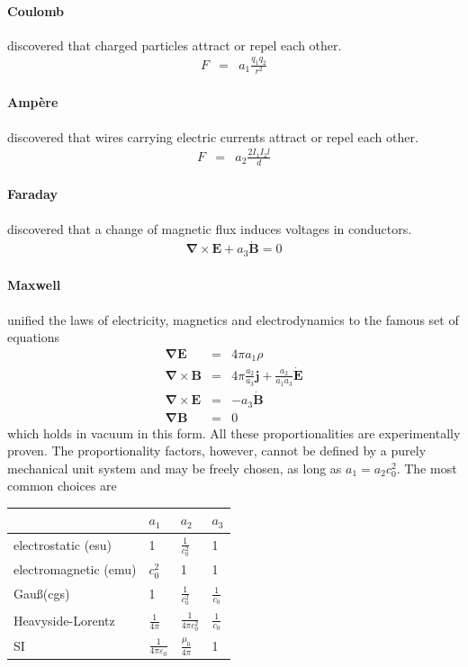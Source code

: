 \documentclass[12pt,a4paper,twoside,openright,BCOR10mm,headsepline,titlepage,abstracton,chapterprefix,final]{scrreprt}
\newcommand\Vector[1]{{\mathbf{#1}}}
\newcommand\vacuum{0}
\newcommand\Nabla{\Vector{\nabla}}
\newcommand\scalarEfield{E}
\newcommand\scalarBfield{B}
\newcommand\Efield{\Vector{\scalarEfield}}
\newcommand\Bfield{\Vector{\scalarBfield}}
\newcommand\vacuumpermeability{\scalarpermeability_{\vacuum}}
\newcommand\scalarpermeability{\mu}
\newcommand\vacuumpermittivity{\scalarpermittivity_{\vacuum}}
\newcommand\scalarpermittivity{\varepsilon}
\newcommand\currentdensity{\Vector{j}}
\newcommand\chargedensity{\rho}
\begin{document}
\paragraph{Coulomb} 
discovered that charged particles attract or repel each other.
\begin{eqnarray}
 F &=& a_1 \frac{q_1 q_2}{r^2}
\end{eqnarray}
\paragraph{Amp\`{e}re} 
discovered that wires carrying electric currents attract or repel each other.
\begin{eqnarray}
 F &=& a_2 \frac{2 I_1 I_2 l}{d}
\end{eqnarray}
\paragraph{Faraday}
discovered that a change of magnetic flux induces voltages in conductors.
\begin{eqnarray}
 \Nabla \times \Efield + a_3 \dot{\Bfield} = 0
\end{eqnarray}
\paragraph{Maxwell} 
unified the laws of electricity, magnetics and electrodynamics to the famous set of equations
\begin{eqnarray}
 \Nabla \Efield &=& 4 \pi a_1 \chargedensity \\
 \Nabla \times \Bfield &=& 4 \pi \frac{a_2}{a_3} \currentdensity + \frac{a_2}{a_1 a_3} \dot{\Efield} \\
 \Nabla \times \Efield &=& - a_3 \dot{\Bfield} \\
 \Nabla \Bfield &=& 0
\end{eqnarray}
which holds in vacuum in this form.
All these proportionalities are experimentally proven.
The proportionality factors, however, cannot be defined by a purely mechanical unit system and may be freely chosen, 
as long as $a_1 = a_2 c_0^2$.
The most common choices are

\begin{tabular}{l|lll}
                       & $a_1$\qquad\qquad                    & $a_2$\qquad\qquad                  & $a_3$ \\
 \hline
 electrostatic (esu)   & 1                                    & $\frac{1}{c_0^2}$                  & 1 \\
 electromagnetic (emu) & $c_0^2$                              & 1                                  & 1 \\
 Gau\ss (cgs)          & 1                                    & $\frac{1}{c_0^2}$                  & $\frac{1}{c_0}$ \\
 Heavyside-Lorentz     & $\frac{1}{4\pi}$                     & $\frac{1}{4\pi c_0^2}$             & $\frac{1}{c_0}$ \\
 SI                    & $\frac{1}{4\pi \vacuumpermittivity}$ & $\frac{\vacuumpermeability}{4\pi}$ & 1 
\end{tabular}\\[2ex]
\end{document}
